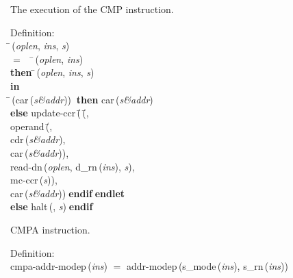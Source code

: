  The execution of the CMP instruction.
\begin{tabbing}{\sc Definition}: \\  
\=\,({\it{oplen\/}}, {\it{ins\/}}, {\it{s\/}}) \\ 
$=$$\;\;\;\;$\=\,({\it{oplen\/}}, {\it{ins\/}}) \\ 
{\bf then }\=\=\,({\it{oplen\/}}, {\it{ins\/}}, {\it{s\/}})\- \\ 
{\bf in} \\ 
\=\,({\rm{car}}\,({\it{s\&addr\/}}))$\;\;${\bf then }{\rm{car}}\,({\it{s\&addr\/}}) \\ 
{\bf else }{\rm{update-ccr}}\,(\=\,(\=, \\ 
{\rm{operand}}\,(\=, \\ 
{\rm{cdr}}\,({\it{s\&addr\/}}), \\ 
{\rm{car}}\,({\it{s\&addr\/}}))\-, \\ 
{\rm{read-dn}}\,({\it{oplen\/}}, {\rm{d\_rn}}\,({\it{ins\/}}), {\it{s\/}}), \\ 
{\rm{mc-ccr}}\,({\it{s\/}}))\-, \\ 
{\rm{car}}\,({\it{s\&addr\/}}))\-$\;${\bf  endif}\-$\;${\bf  endlet}\- \\ 
{\bf else }{\rm{halt}}\,({}, {\it{s\/}})$\;${\bf  endif}\-\-
\end{tabbing}

 CMPA instruction.
\begin{tabbing}{\sc Definition}: \\  
{\rm{cmpa-addr-modep}}\,({\it{ins\/}}) $=$ {\rm{addr-modep}}\,({\rm{s\_mode}}\,({\it{ins\/}}), {\rm{s\_rn}}\,({\it{ins\/}}))
\end{tabbing}

